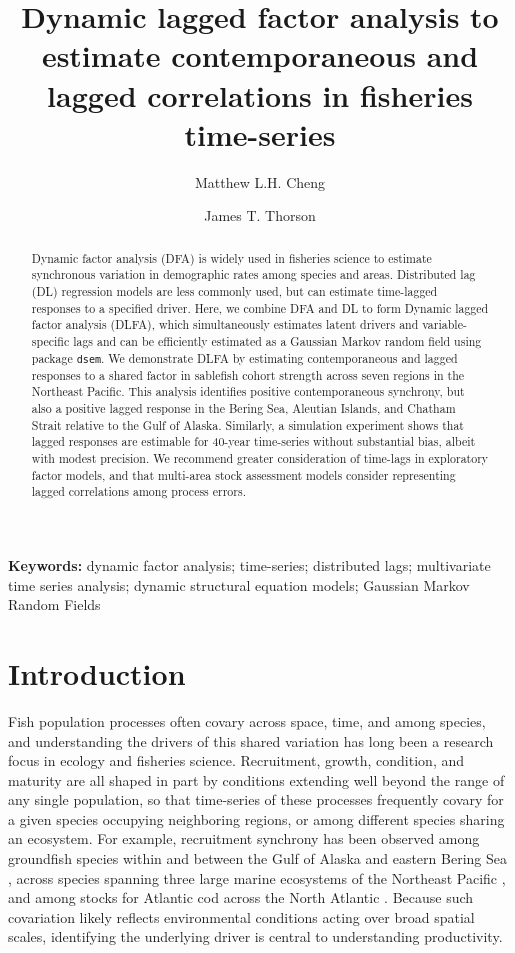 \documentclass[12pt]{article}
\date{\vspace{-1.5em}}
\title{\large Dynamic lagged factor analysis to estimate contemporaneous and lagged correlations in fisheries time-series}
\author[1,2]{Matthew L.H. Cheng}
\author[3]{James T. Thorson}
\affil[1]{College of Fisheries and Ocean Sciences, University of Alaska Fairbanks, Juneau, AK, USA}
\affil[2]{Auke Bay Laboratories, Alaska Fisheries Science Center, National Marine Fisheries Service, NOAA, Juneau, AK 99801, USA}
\affil[3]{Technical University of Denmark, Kongens Lyngby, Denmark}
\begin{document}
\maketitle

\begin{abstract}
\noindent Dynamic factor analysis (DFA) is widely used in fisheries
science to estimate synchronous variation in demographic rates among
species and areas. Distributed lag (DL) regression models are less
commonly used, but can estimate time-lagged responses to a specified
driver. Here, we combine DFA and DL to form Dynamic lagged factor
analysis (DLFA), which simultaneously estimates latent drivers and
variable-specific lags and can be efficiently estimated as a Gaussian
Markov random field using package \texttt{dsem}. We demonstrate DLFA by
estimating contemporaneous and lagged responses to a shared factor in
sablefish cohort strength across seven regions in the Northeast Pacific.
This analysis identifies positive contemporaneous synchrony, but also a
positive lagged response in the Bering Sea, Aleutian Islands, and
Chatham Strait relative to the Gulf of Alaska. Similarly, a simulation
experiment shows that lagged responses are estimable for 40-year
time-series without substantial bias, albeit with modest precision. We
recommend greater consideration of time-lags in exploratory factor models, and
that multi-area stock assessment models consider representing lagged
correlations among process errors.
\end{abstract}

\noindent\textbf{Keywords:} dynamic factor analysis; time-series;
distributed lags; multivariate time series analysis; dynamic structural
equation models; Gaussian Markov Random Fields

\clearpage

\section{Introduction}
\label{sec:intro}

Fish population processes often covary across space, time, and among
species, and understanding the drivers of this shared variation has long
been a research focus in ecology and fisheries science. Recruitment, growth, condition, and
maturity are all shaped in part by conditions extending well beyond the
range of any single population, so that time-series of these processes
frequently covary for a given species occupying neighboring regions, or
among different species sharing an ecosystem. For example, recruitment
synchrony has been observed among groundfish species within and between
the Gulf of Alaska and eastern Bering Sea \citep[e.g.,][]{mueter_2007},
across species spanning three large marine ecosystems of the Northeast
Pacific \citep{stachura_2014}, and among stocks for Atlantic cod across
the North Atlantic \citep{minto_productivity_2014}. Because such
covariation likely reflects environmental conditions acting over broad
spatial scales, identifying the underlying driver is central to
understanding productivity.
\end{document}
